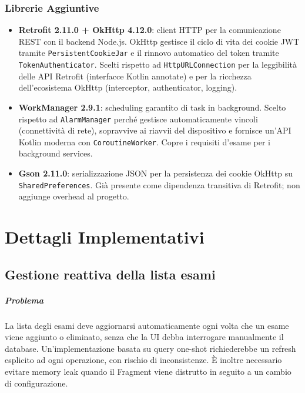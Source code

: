 \documentclass[a4paper,12pt]{report}
\begin{document}
    \subsection{Librerie Aggiuntive}

    \begin{itemize}
        \item \textbf{Retrofit 2.11.0 + OkHttp 4.12.0}: client HTTP per la comunicazione
        REST con il backend Node.js. OkHttp gestisce il ciclo di vita dei cookie JWT
        tramite \texttt{PersistentCookieJar} e il rinnovo automatico del token tramite
        \texttt{TokenAuthenticator}. Scelti rispetto ad \texttt{HttpURLConnection} per
        la leggibilità delle API Retrofit (interfacce Kotlin annotate) e per la ricchezza
        dell'ecosistema OkHttp (interceptor, authenticator, logging).

        \item \textbf{WorkManager 2.9.1}: scheduling garantito di task in background.
        Scelto rispetto ad \texttt{AlarmManager} perché gestisce automaticamente
        vincoli (connettività di rete), sopravvive ai riavvii del dispositivo e
        fornisce un'API Kotlin moderna con \texttt{CoroutineWorker}. Copre i requisiti
        d'esame per i background services.

        \item \textbf{Gson 2.11.0}: serializzazione JSON per la persistenza dei cookie
        OkHttp su \texttt{SharedPreferences}. Già presente come dipendenza transitiva
        di Retrofit; non aggiunge overhead al progetto.
    \end{itemize}

    \chapter{Dettagli Implementativi}

    \section{Gestione reattiva della lista esami}

    \paragraph{Problema}
    La lista degli esami deve aggiornarsi automaticamente ogni volta che un esame viene
    aggiunto o eliminato, senza che la UI debba interrogare manualmente il database.
    Un'implementazione basata su query one-shot richiederebbe un refresh esplicito
    ad ogni operazione, con rischio di inconsistenze. È inoltre necessario evitare
    memory leak quando il Fragment viene distrutto in seguito a un cambio di configurazione.
\end{document}

